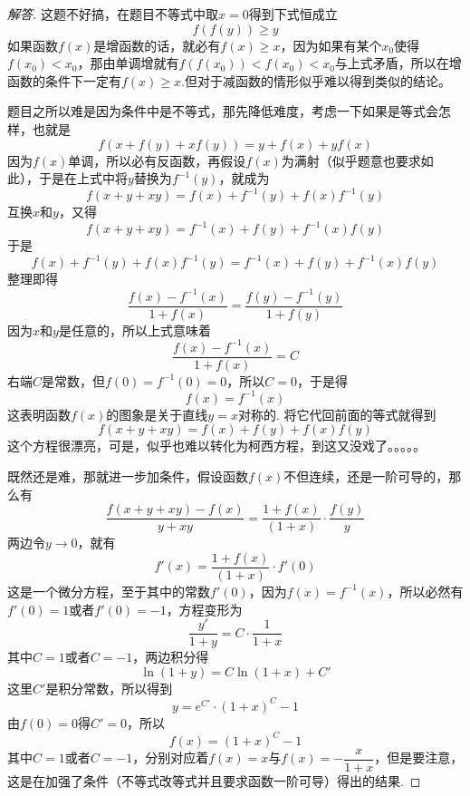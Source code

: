 \begin{proof}[解答]
这题不好搞，在题目不等式中取$x=0$得到下式恒成立
\[ f(f(y)) \geqslant y \]
如果函数$f(x)$是增函数的话，就必有$f(x) \geqslant x$，因为如果有某个$x_0$使得$f(x_0)<x_0$，那由单调增就有$f(f(x_0))<f(x_0)<x_0$与上式矛盾，所以在增函数的条件下一定有$f(x) \geqslant x$.但对于减函数的情形似乎难以得到类似的结论。

题目之所以难是因为条件中是不等式，那先降低难度，考虑一下如果是等式会怎样，也就是
\[ f(x+f(y)+xf(y)) = y+f(x)+yf(x) \]
因为$f(x)$单调，所以必有反函数，再假设$f(x)$为满射（似乎题意也要求如此），于是在上式中将$y$替换为$f^{-1}(y)$，就成为
\[ f(x+y+xy)=f(x)+f^{-1}(y)+f(x)f^{-1}(y) \]
互换$x$和$y$，又得
\[ f(x+y+xy)=f^{-1}(x)+f(y)+f^{-1}(x)f(y) \]
于是
\[ f(x)+f^{-1}(y)+f(x)f^{-1}(y) = f^{-1}(x)+f(y)+f^{-1}(x)f(y) \]
整理即得
\[ \frac{f(x)-f^{-1}(x)}{1+f(x)}=\frac{f(y)-f^{-1}(y)}{1+f(y)} \] 
因为$x$和$y$是任意的，所以上式意味着
\[  \frac{f(x)-f^{-1}(x)}{1+f(x)}=C \]
右端$C$是常数，但$f(0)=f^{-1}(0)=0$，所以$C=0$，于是得
\[ f(x)=f^{-1}(x) \]
这表明函数$f(x)$的图象是关于直线$y=x$对称的. 将它代回前面的等式就得到
\[ f(x+y+xy)=f(x)+f(y)+f(x)f(y) \]
这个方程很漂亮，可是，似乎也难以转化为柯西方程，到这又没戏了。。。。。

既然还是难，那就进一步加条件，假设函数$f(x)$不但连续，还是一阶可导的，那么有
\[ \frac{f(x+y+xy)-f(x)}{y+xy} = \frac{1+f(x)}{(1+x)} \cdot \frac{f(y)}{y} \]
两边令$y \to 0$，就有
\[ f'(x) =  \frac{1+f(x)}{(1+x)}  \cdot f'(0) \]
这是一个微分方程，至于其中的常数$f'(0)$，因为$f(x)=f^{-1}(x)$，所以必然有$f'(0)=1$或者$f'(0)=-1$，方程变形为
\[ \frac{y'}{1+y} = C \cdot \frac{1}{1+x} \]
其中$C=1$或者$C=-1$，两边积分得
\[ \ln{(1+y)} = C \ln{(1+x)}+C' \]
这里$C'$是积分常数，所以得到
\[ y= e^{C'} \cdot (1+x)^C - 1 \]
由$f(0)=0$得$C'=0$，所以
\[ f(x)=(1+x)^C-1 \]
其中$C=1$或者$C=-1$，分别对应着$f(x)=x$与$f(x)=-\dfrac{x}{1+x}$，但是要注意，这是在加强了条件（不等式改等式并且要求函数一阶可导）得出的结果.
\end{proof}





